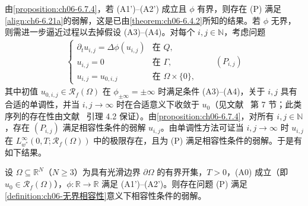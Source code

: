 \documentclass[../../main.tex]{subfiles}%
\begin{document}
由\cref{proposition:ch06-6.7.4}，若 (A1')--(A2') 成立且 $\phi$ 有界，则存在 (P) 满足\eqref{align:ch6-6.21a}的弱解，这是已由\cref{theorem:ch06-6.4.2}所知的结果。若 $\phi$ 无界，则需进一步逼近过程以去掉假设 (A3)--(A4)。对每个 $i,j\in\mathbb{N}$，考虑问题
\begin{align*}
\begin{cases}
\partial_t u_{i,j}=\Delta\phi(u_{i,j}) & \text{在 }Q,\\
u_{i,j}=0 & \text{在 }\Gamma,\\
u_{i,j}=u_{0,i,j} & \text{在 }\Omega\times\{0\},
\end{cases}
\qquad(P_{i,j})
\end{align*}
其中初值 $u_{0,i,j}\in\mathscr{R}_f(\Omega)$ 在 $\phi_{\pm\infty}=\pm\infty$ 时满足条件 (A3)--(A4)，关于 $i,j$ 具有合适的单调性，并当 $i,j\to\infty$ 时在合适意义下收敛于 $u_0$（见文献~\cite{ref87} 第 7 节；此类序列的存在性由文献~\cite{ref10} 引理 4.2 保证）。由\cref{proposition:ch06-6.7.4}，对所有 $i,j\in\mathbb{N}$，存在 $(P_{i,j})$ 满足相容性条件的弱解 $u_{i,j}$。由单调性方法可证当 $i,j\to\infty$ 时 $u_{i,j}$ 在 $L^\infty_{w^*}(0,T;\mathscr{R}_f(\Omega))$ 中的极限存在，且为 (P) 满足相容性条件的弱解。于是有如下结果。

\begin{theorem}\label{theorem:ch06-6.7.5}
设 $\Omega\subseteq\mathbb{R}^N$（$N\geqslant3$）为具有光滑边界 $\partial\Omega$ 的有界开集，$T>0$，(A0) 成立（即 $u_0\in\mathscr{R}_f(\Omega)$），$\phi:\mathbb{R}\to\mathbb{R}$ 满足 (A1')--(A2')。则存在问题 (P) 满足\cref{definition:ch06-无界相容性}意义下相容性条件的弱解。
\end{theorem}
\end{document}
